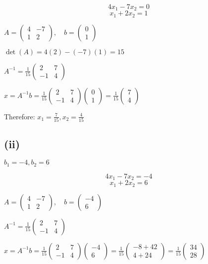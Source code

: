 \documentclass[12pt]{article}
\begin{document}
\[
	4x_1 - 7x_2 = 0
\]
\[
	x_1 + 2x_2 = 1
\]

$A = \begin{pmatrix}
	4 & -7 \\
	1 & 2
\end{pmatrix}, \quad b = \begin{pmatrix}
	0 \\
	1
\end{pmatrix}$

$\det(A) = 4(2) - (-7)(1) = 15$

$A^{-1} = \frac{1}{15}\begin{pmatrix}
	2 & 7 \\
	-1 & 4
\end{pmatrix}$

$x = A^{-1}b = \frac{1}{15}\begin{pmatrix}
	2 & 7 \\
	-1 & 4
\end{pmatrix}\begin{pmatrix}
	0 \\
	1
\end{pmatrix} = \frac{1}{15}\begin{pmatrix}
	7 \\
	4
\end{pmatrix}$

Therefore: $x_1 = \frac{7}{15}, x_2 = \frac{4}{15}$

\subsection*{(ii)} $b_1 = -4, b_2 = 6$

\[
	4x_1 - 7x_2 = -4
\]
\[
	x_1 + 2x_2 = 6
\]

$A = \begin{pmatrix}
	4 & -7 \\
	1 & 2
\end{pmatrix}, \quad b = \begin{pmatrix}
	-4 \\
	6
\end{pmatrix}$

$A^{-1} = \frac{1}{15}\begin{pmatrix}
	2 & 7 \\
	-1 & 4
\end{pmatrix}$

$x = A^{-1}b = \frac{1}{15}\begin{pmatrix}
	2 & 7 \\
	-1 & 4
\end{pmatrix}\begin{pmatrix}
	-4 \\
	6
\end{pmatrix} = \frac{1}{15}\begin{pmatrix}
	-8 + 42 \\
	4 + 24
\end{pmatrix} = \frac{1}{15}\begin{pmatrix}
	34 \\
	28
\end{pmatrix}$
\end{document}
